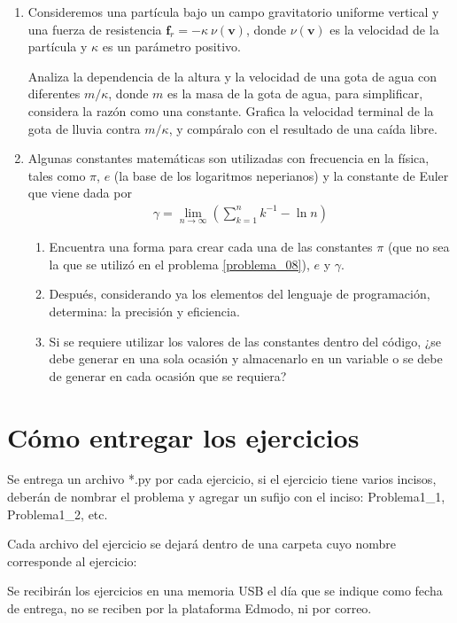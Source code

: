 \begin{enumerate}
\item Consideremos una partícula bajo un campo gravitatorio uniforme vertical y una fuerza de resistencia $\mathbf{f}_{r} = - \kappa \: \nu(\mathbf{v})$, donde $\nu(\mathbf{v})$ es la velocidad de la partícula y $\kappa$ es un parámetro positivo.
\par
Analiza la dependencia de la altura y la velocidad de una gota de agua con diferentes $m/\kappa$, donde $m$ es la masa de la gota de agua, para simplificar, considera la razón como una constante. Grafica la velocidad terminal de la gota de lluvia contra $m/\kappa$, y compáralo con el resultado de una caída libre.
\item Algunas constantes matemáticas son utilizadas con frecuencia en la física, tales como $\pi$, $e$ (la base de los logaritmos neperianos) y la constante de Euler que viene dada por
\begin{align*}
\gamma = \lim_{n \rightarrow \infty} \left( \sum_{k = 1}^{n} k^{ - 1} - \ln n \right)
\end{align*}
\begin{enumerate}
\item Encuentra una forma para crear cada una de las constantes $\pi$ (que no sea la que se utilizó en el problema \ref{problema_08}), $e$ y $\gamma$.
\item Después, considerando ya los elementos del lenguaje de programación, determina: la precisión y eficiencia. 
\item Si se requiere utilizar los valores de las constantes dentro del código, ¿se debe generar en una sola ocasión y almacenarlo en un variable o se debe de generar en cada ocasión que se requiera?
\end{enumerate}
\end{enumerate}
\section*{Cómo entregar los ejercicios}
Se entrega un archivo *.py por cada ejercicio, si el ejercicio tiene varios incisos, deberán de nombrar el problema y agregar un sufijo con el inciso: Problema1\_1, Problema1\_2, etc.
\par
Cada archivo del ejercicio se dejará dentro de una carpeta cuyo nombre corresponde al ejercicio:
\par
{}
Se recibirán los ejercicios en una memoria USB el día que se indique como fecha de entrega, no se reciben por la plataforma Edmodo, ni por correo.	
